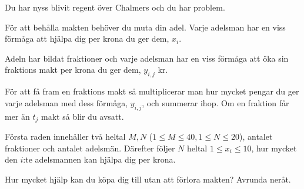 Du har nyss blivit regent över Chalmers och du har problem.

För att behålla makten behöver du muta din adel. Varje adelsman har en viss förmåga att hjälpa dig per krona du ger dem, $x_i$.

Adeln har bildat fraktioner och varje adelsman har en viss förmåga att öka sin fraktions makt per krona du ger dem, $y_{i,j}$ kr.

För att få fram en fraktions makt så multiplicerar man hur mycket pengar du ger varje adelsman med dess förmåga, $y_{i,j}$, och summerar ihop. Om en fraktion får mer än $t_j$ makt så blir du avsatt.

Första raden innehåller två heltal $M, N$ ($1 \leq M \leq 40, 1 \leq N \leq 20$), antalet fraktioner och antalet adelsmän.
Därefter följer $N$ heltal $1 \leq x_i \leq 10$, hur mycket den $i$:te adelsmannen kan hjälpa dig per krona.

Hur mycket hjälp kan du köpa dig till utan att förlora makten? Avrunda neråt.
